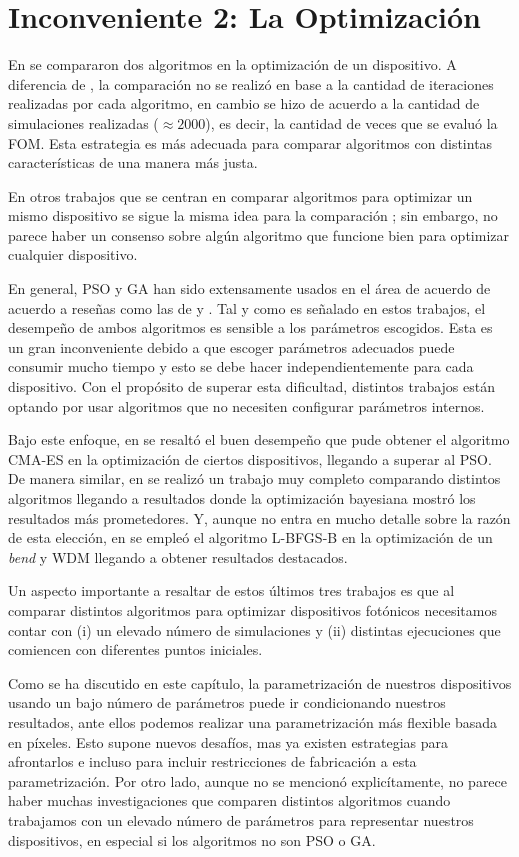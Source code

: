 \section{Inconveniente 2: La Optimización}

En \cite{Malheiros-Silveira2020} se compararon dos algoritmos en la optimización de un dispositivo.
A diferencia de \cite{Prosopio-Galarza2019}, la comparación no se realizó en base a la cantidad de iteraciones
realizadas por cada algoritmo, en cambio se hizo de acuerdo a la cantidad de simulaciones realizadas 
($\approx 2000$), es decir, la cantidad de veces que se evaluó la FOM. 
Esta estrategia es más adecuada para comparar algoritmos con distintas características de una manera más justa.


En otros trabajos que se centran en comparar algoritmos para optimizar un mismo dispositivo se sigue la misma
idea para la comparación \citep{Schneider2019, Gregory2015}; sin embargo, no parece haber un consenso sobre algún algoritmo que funcione bien
para optimizar cualquier dispositivo.


En general, PSO y GA han sido extensamente usados en el área de acuerdo de acuerdo a reseñas como las de
\cite{Elsawy2020} y \cite{Campbell2019}. Tal y como es señalado en estos trabajos, el desempeño de ambos
algoritmos es sensible a los parámetros escogidos. Esta es un gran inconveniente debido a que escoger
parámetros adecuados puede consumir mucho tiempo y esto se debe hacer independientemente para cada
dispositivo. Con el propósito de superar esta dificultad, distintos trabajos están optando por usar algoritmos
que no necesiten configurar parámetros internos.


Bajo este enfoque, en \cite{Gregory2015} se resaltó el buen desempeño que pude obtener el algoritmo CMA-ES en
la optimización de ciertos dispositivos, llegando a superar al PSO.
De manera similar, en \cite{Schneider2019} se realizó un trabajo muy completo comparando distintos algoritmos
llegando a resultados donde la optimización bayesiana mostró los resultados más prometedores.
Y, aunque no entra en mucho detalle sobre la razón de esta elección, en \cite{Su2020} se empleó el algoritmo 
L-BFGS-B en la optimización de un \emph{bend} y WDM llegando a obtener resultados destacados.

Un aspecto importante a resaltar de estos últimos tres trabajos es que al comparar distintos algoritmos para
optimizar dispositivos fotónicos necesitamos contar con
(i) un elevado número de simulaciones y
(ii) distintas ejecuciones que comiencen con diferentes puntos iniciales.

Como se ha discutido en este capítulo, la parametrización de nuestros dispositivos usando un bajo número
de parámetros puede ir condicionando nuestros resultados, ante ellos podemos realizar una parametrización
más flexible basada en píxeles. Esto supone nuevos desafíos, mas ya existen estrategias para afrontarlos e
incluso para incluir restricciones de fabricación a esta parametrización.
Por otro lado, aunque no se mencionó explicítamente, no parece haber muchas
investigaciones que comparen distintos algoritmos cuando trabajamos con un elevado número de parámetros para
representar nuestros dispositivos, en especial si los algoritmos no son PSO o GA.
